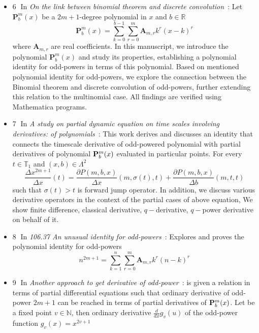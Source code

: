 \begin{itemize}
    \item {\Large \textcircled{\normalsize 6}}
    In \textit{On the link between binomial theorem and discrete convolution}~\cite{kolosov2016link}:
    Let $\mathbf{P}^{m}_{b}(x)$ be a $2m+1$-degree polynomial in $x$ and $b \in \mathbb{R}$
    \[
        \mathbf{P}^{m}_{b}(x) = \sum_{k=0}^{b-1} \sum_{r=0}^{m} \mathbf{A}_{m,r} k^r (x-k)^r
    \]
    where $\mathbf{A}_{m,r}$ are real coefficients.
    In this manuscript, we introduce the polynomial $\mathbf{P}^{m}_{b}(x)$ and study its properties,
    establishing a polynomial identity for odd-powers in terms of this polynomial.
    Based on mentioned polynomial identity for odd-powers,
    we explore the connection between the Binomial theorem and discrete convolution of odd-powers,
    further extending this relation to the multinomial case.
    All findings are verified using Mathematica programs.
    \item {\Large \textcircled{\normalsize 7}}
    In \textit{A study on partial dynamic equation on time scales involving derivatives:
    of polynomials}~\cite{kolosov2016study}:
    This work derives and discusses an identity that connects the timescale derivative of odd-powered polynomial
    with partial derivatives of polynomial ${\mathbf{P}}\sp{m} \sb{b}(x)$ evaluated in particular points.
    For every $t\in\mathbb{T}_1$ and $(x,b) \in \Lambda^2$
    \[
        \frac{\Delta x^{2m+1}}{\Delta x}(t) =
        \frac{\partial P(m,b,x)}{\Delta x} (m, \sigma(t), t) +
        \frac{\partial P(m,b,x)}{\Delta b} (m, t, t)
    \]
    such that $\sigma(t) > t$ is forward jump operator.
    In addition, we discuss various derivative operators in the context of the partial cases of above equation,
    We show finite difference, classical derivative, $q-$derivative, $q-$power derivative on behalf of it.
    \item {\Large \textcircled{\normalsize 8}}
    In \textit{106.37 An unusual identity for odd-powers}~\cite{kolosov2022106}:
    Explores and proves the polynomial identity for odd-powers
    \[
        n^{2m+1} = \sum_{k=1}^{n} \sum_{r=0}^{m} \mathbf{A}_{m,r} k^r (n-k)^r
    \]
    \item {\Large \textcircled{\normalsize 9}}
    In \textit{Another approach to get derivative of odd-power}~\cite{kolosov2023another}:
    is given a relation in terms of partial differential equations such that
    ordinary derivative of odd-power $2m+1$ can be reached in terms of partial derivatives of ${\mathbf{P}}\sp{m} \sb{b}(x)$.
    Let be a fixed point $v\in \mathbb{N}$, then ordinary derivative $\frac{d}{dx} g_v (u)$ of the odd-power function $g_v(x) = x^{2v + 1}$

\end{itemize}
